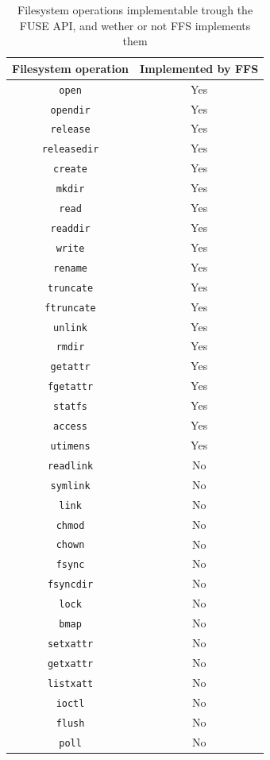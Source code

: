 \begin{table}[!ht]
	\begin{center}
		\caption{Filesystem operations implementable trough the FUSE API, and wether or not FFS implements them}
		\begin{tabular}{| c | c |}
			
			\hline
			\textbf{Filesystem operation} 	& \textbf{Implemented by FFS}\\
			\hline
			\hline
			\texttt{open} & Yes\\
			\texttt{opendir} & Yes\\
			\texttt{release} & Yes\\
			\texttt{releasedir} & Yes\\
			\texttt{create} & Yes\\
			\texttt{mkdir} & Yes\\
			\texttt{read} & Yes\\
			\texttt{readdir} & Yes\\
			\texttt{write} & Yes\\
			\texttt{rename} & Yes\\
			\texttt{truncate} & Yes\\
			\texttt{ftruncate} & Yes\\
			\texttt{unlink} & Yes\\
			\texttt{rmdir} & Yes\\
			\texttt{getattr} & Yes\\
			\texttt{fgetattr} & Yes\\
			\texttt{statfs} & Yes\\
			\texttt{access} & Yes\\
			\texttt{utimens} & Yes\\
			\texttt{readlink} & No\\
			\texttt{symlink} & No\\
			\texttt{link} & No\\
			\texttt{chmod} & No\\
			\texttt{chown} & No\\
			\texttt{fsync} & No\\
			\texttt{fsyncdir} & No\\
			\texttt{lock} & No\\
			\texttt{bmap} & No\\
			\texttt{setxattr} & No\\
			\texttt{getxattr} & No\\
			\texttt{listxatt} & No\\
			\texttt{ioctl} & No\\
			\texttt{flush} & No\\
			\texttt{poll} & No\\
			\hline

		\end{tabular}
		\label{tbl:fs_impl_op}
	\end{center}
\end{table}

